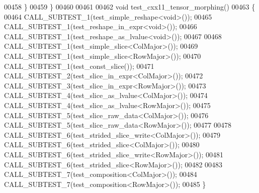 \begin{DoxyCode}
00458   \}
00459 \}
00460 
00461 
00462 \textcolor{keywordtype}{void} test\_cxx11\_tensor\_morphing()
00463 \{
00464   CALL\_SUBTEST\_1(test\_simple\_reshape<void>());
00465   CALL\_SUBTEST\_1(test\_reshape\_in\_expr<void>());
00466   CALL\_SUBTEST\_1(test\_reshape\_as\_lvalue<void>());
00467 
00468   CALL\_SUBTEST\_1(test\_simple\_slice<ColMajor>());
00469   CALL\_SUBTEST\_1(test\_simple\_slice<RowMajor>());
00470   CALL\_SUBTEST\_1(test\_const\_slice());
00471   CALL\_SUBTEST\_2(test\_slice\_in\_expr<ColMajor>());
00472   CALL\_SUBTEST\_3(test\_slice\_in\_expr<RowMajor>());
00473   CALL\_SUBTEST\_4(test\_slice\_as\_lvalue<ColMajor>());
00474   CALL\_SUBTEST\_4(test\_slice\_as\_lvalue<RowMajor>());
00475   CALL\_SUBTEST\_5(test\_slice\_raw\_data<ColMajor>());
00476   CALL\_SUBTEST\_5(test\_slice\_raw\_data<RowMajor>());
00477 
00478   CALL\_SUBTEST\_6(test\_strided\_slice\_write<ColMajor>());
00479   CALL\_SUBTEST\_6(test\_strided\_slice<ColMajor>());
00480   CALL\_SUBTEST\_6(test\_strided\_slice\_write<RowMajor>());
00481   CALL\_SUBTEST\_6(test\_strided\_slice<RowMajor>());
00482 
00483   CALL\_SUBTEST\_7(test\_composition<ColMajor>());
00484   CALL\_SUBTEST\_7(test\_composition<RowMajor>());
00485 \}
\end{DoxyCode}
